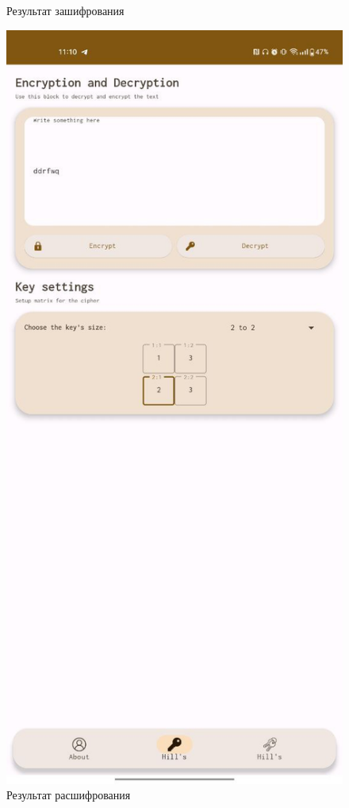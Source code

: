 \documentclass[a4paper]{article}
\begin{document}
\begin{figure}[H]
\begin{minipage}{0.3\textwidth}
        \caption{Результат зашифрования}
    \end{minipage}
    \hfill
    \begin{minipage}{0.3\textwidth}
        \centering
        \includegraphics[width=\textwidth]{02_0003}
        \caption{Результат расшифрования}
    \end{minipage}
  \end{figure}
\end{document}
